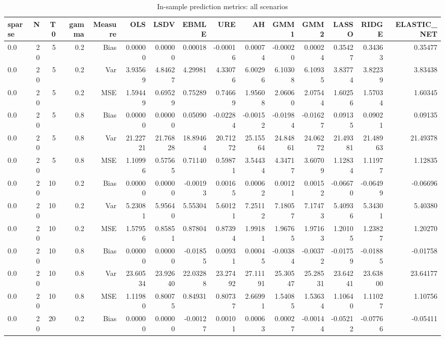 \begin{table}[!htbp]\centering
\caption{In-sample prediction metrics: all scenarios}
\label{tab:table2_all_scenarios}
\begin{tabular}{lrrrrrrrrrrrrrr}
\hline
sparse & N & T0 & gamma & Measure & OLS & LSDV & EBMLE & URE & AH & GMM1 & GMM2 & LASSO & RIDGE & ELASTIC_NET \\
\hline
0.0 &  20 &  5 & 0.2 & Bias & 0.00000 & 0.00000 & 0.00018 & -0.00016 & 0.00074 & -0.00020 & 0.00024 & 0.35427 & 0.34363 & 0.35477 \\
0.0 &  20 &  5 & 0.2 & Var & 3.93569 & 4.84627 & 4.29981 & 4.33076 & 6.00296 & 6.10308 & 6.10935 & 3.83774 & 3.82239 & 3.83438 \\
0.0 &  20 &  5 & 0.2 & MSE & 1.59449 & 0.69529 & 0.75289 & 0.74669 & 1.95608 & 2.06060 & 2.07544 & 1.60256 & 1.57034 & 1.60345 \\
0.0 &  20 &  5 & 0.8 & Bias & 0.00000 & 0.00000 & 0.05090 & -0.02284 & -0.00152 & -0.01984 & -0.01627 & 0.09135 & 0.09021 & 0.09135 \\
0.0 &  20 &  5 & 0.8 & Var & 21.22721 & 21.76828 & 18.89464 & 20.71272 & 25.15564 & 24.84861 & 24.06272 & 21.49381 & 21.48963 & 21.49378 \\
0.0 &  20 &  5 & 0.8 & MSE & 1.10996 & 0.57565 & 0.71140 & 0.59871 & 3.54434 & 4.34717 & 3.60709 & 1.12834 & 1.11977 & 1.12835 \\
0.0 &  20 & 10 & 0.2 & Bias & 0.00000 & 0.00000 & -0.00193 & 0.00165 & 0.00062 & 0.00121 & 0.00152 & -0.06670 & -0.06499 & -0.06696 \\
0.0 &  20 & 10 & 0.2 & Var & 5.23081 & 5.95640 & 5.55304 & 5.60121 & 7.25112 & 7.18057 & 7.17473 & 5.40936 & 5.34301 & 5.40380 \\
0.0 &  20 & 10 & 0.2 & MSE & 1.57956 & 0.85851 & 0.87804 & 0.87394 & 1.99181 & 1.96765 & 1.97163 & 1.20105 & 1.23827 & 1.20270 \\
0.0 &  20 & 10 & 0.8 & Bias & 0.00000 & 0.00000 & -0.01855 & 0.00931 & 0.00045 & -0.00384 & -0.00372 & -0.01759 & -0.01885 & -0.01758 \\
0.0 &  20 & 10 & 0.8 & Var & 23.60534 & 23.92640 & 22.03288 & 23.27492 & 27.11191 & 25.30547 & 25.28531 & 23.64241 & 23.63800 & 23.64177 \\
0.0 &  20 & 10 & 0.8 & MSE & 1.11980 & 0.80075 & 0.84931 & 0.80737 & 2.66991 & 1.54085 & 1.53634 & 1.10640 & 1.11027 & 1.10756 \\
0.0 &  20 & 20 & 0.2 & Bias & 0.00000 & 0.00000 & -0.00127 & 0.00101 & 0.00063 & 0.00027 & -0.00144 & -0.05212 & -0.07766 & -0.05411 \\

\end{tabular}
\end{table}
